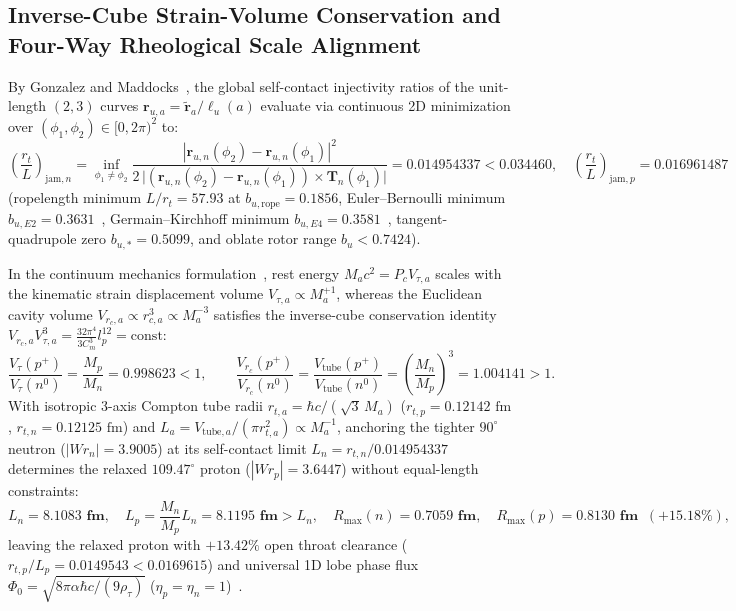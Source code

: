\documentclass[11pt, a4paper]{article}
\DeclareRobustCommand{\Rmax}{R_{\max}}
\begin{document}
\subsection{Inverse-Cube Strain-Volume Conservation and Four-Way Rheological Scale Alignment}
By Gonzalez and Maddocks~\cite{gonzalez1999}, the global self-contact injectivity ratios of the unit-length $(2,3)$ curves $\mathbf{r}_{u,a} = \tilde{\mathbf{r}}_a/\ell_u(a)$ evaluate via continuous 2D minimization over $(\phi_1, \phi_2) \in [0, 2\pi)^2$ to:
\begin{equation}
    \left(\frac{r_t}{L}\right)_{\!\mathrm{jam},n} = \inf_{\phi_1 \neq \phi_2} \frac{|\mathbf{r}_{u,n}(\phi_2) - \mathbf{r}_{u,n}(\phi_1)|^2}{2\,\big|(\mathbf{r}_{u,n}(\phi_2) - \mathbf{r}_{u,n}(\phi_1)) \times \mathbf{T}_n(\phi_1)\big|} = \mathbf{0.014954337} < 0.034460, \quad
    \left(\frac{r_t}{L}\right)_{\!\mathrm{jam},p} = \mathbf{0.016961487}
    \label{eq:steric_ratio}
\end{equation}
(ropelength minimum $L/r_t = 57.93$ at $b_{u,\mathrm{rope}} = 0.1856$, Euler--Bernoulli minimum $b_{u,E2} = 0.3631$~\cite{euler1762}, Germain--Kirchhoff minimum $b_{u,E4} = 0.3581$~\cite{germain1821}, tangent-quadrupole zero $b_{u,*} = 0.5099$, and oblate rotor range $b_u < 0.7424$).

In the continuum mechanics formulation~\cite{bairmosheh2026}, rest energy $M_a c^2 = P_c V_{\tau,a}$ scales with the kinematic strain displacement volume $V_{\tau,a} \propto M_a^{+1}$, whereas the Euclidean cavity volume $V_{r_c,a} \propto r_{c,a}^3 \propto M_a^{-3}$ satisfies the inverse-cube conservation identity $V_{r_c,a} V_{\tau,a}^3 = \frac{32\pi^4}{3C_m^3}l_p^{12} = \text{const}$:
\begin{equation}
    \frac{V_\tau(p^+)}{V_\tau(n^0)} = \frac{M_p}{M_n} = \mathbf{0.998623} < 1, \qquad
    \frac{V_{r_c}(p^+)}{V_{r_c}(n^0)} = \frac{V_{\mathrm{tube}}(p^+)}{V_{\mathrm{tube}}(n^0)} = \left(\frac{M_n}{M_p}\right)^{\!3} = \mathbf{1.004141} > 1.
    \label{eq:inverse_cube_conservation}
\end{equation}
With isotropic 3-axis Compton tube radii $r_{t,a} = \hbar c/(\sqrt{3}\,M_a)$ ($r_{t,p} = 0.12142\text{ fm}$, $r_{t,n} = 0.12125\text{ fm}$) and $L_a = V_{\mathrm{tube},a}/(\pi r_{t,a}^2) \propto M_a^{-1}$, anchoring the tighter $90^\circ$ neutron ($|Wr_n| = 3.9005$) at its self-contact limit $L_n = r_{t,n}/0.014954337$ determines the relaxed $109.47^\circ$ proton ($|Wr_p| = 3.6447$) without equal-length constraints:
\begin{equation}
    L_n = \mathbf{8.1083\text{ fm}}, \quad L_p = \frac{M_n}{M_p}L_n = \mathbf{8.1195\text{ fm}} > L_n, \quad
    \Rmax(n) = \mathbf{0.7059\text{ fm}}, \quad \Rmax(p) = \mathbf{0.8130\text{ fm}}\;\;(+15.18\%),
    \label{eq:relaxed_proton_scales}
\end{equation}
leaving the relaxed proton with $+13.42\%$ open throat clearance ($r_{t,p}/L_p = 0.0149543 < 0.0169615$) and universal 1D lobe phase flux $\Phi_0 = \sqrt{8\pi\alpha\hbar c/(9\rho_\tau)}$ ($\eta_p = \eta_n = 1$)~\cite{bairmosheh2026}.
\end{document}
